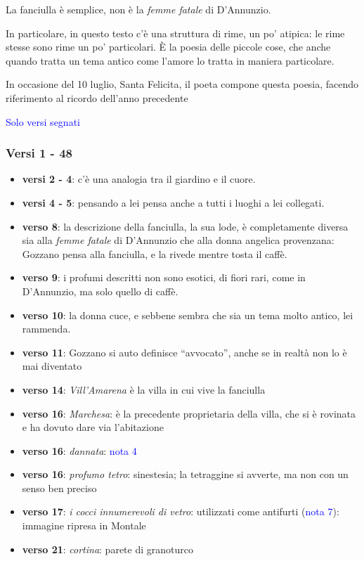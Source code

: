 \documentclass[a4paper, twoside, titlepage]{book}
\newcounter{mar}
\newcommand{\elenco}[1]{%
\begin{itemize}
#1
\end{itemize}}
\renewcommand{\emph}[1]{\textcolor{blue}{#1}}
\begin{document}
La fanciulla è semplice, non è la \textit{femme fatale} di D’Annunzio.

In particolare, in questo testo c’è una struttura di rime, un po’ atipica: le rime stesse sono rime un po’ particolari. È la poesia delle piccole cose, che anche quando tratta un tema antico come l’amore lo tratta in maniera particolare.

In occasione del 10 luglio, Santa Felicita, il poeta compone questa poesia, facendo riferimento al ricordo dell’anno precedente

\emph{Solo versi segnati}

\subsubsection{Versi 1 - 48}

\elenco{
	\item \textbf{versi 2 - 4}: c’è una analogia tra il giardino e il cuore. 
	\item \textbf{versi 4 - 5}: pensando a lei pensa anche a tutti i luoghi a lei collegati.
	\item \textbf{verso 8}: la descrizione della fanciulla, la sua lode, è completamente diversa sia alla \textit{femme fatale} di D’Annunzio che alla donna angelica provenzana: Gozzano pensa alla fanciulla, e la rivede mentre tosta il caffè.
	\item \textbf{verso 9}: i profumi descritti non sono esotici, di fiori rari, come in D’Annunzio, ma solo quello di caffè.
	\item \textbf{verso 10}: la donna cuce, e sebbene sembra che sia un tema molto antico, lei rammenda.
	\item \textbf{verso 11}: Gozzano si auto definisce “avvocato”, anche se in realtà non lo è mai diventato
	\item \textbf{verso 14}: \textit{Vill’Amarena} è la villa in cui vive la fanciulla
	\item \textbf{verso 16}: \textit{Marchesa}: è la precedente proprietaria della villa, che si è rovinata e ha dovuto dare via l’abitazione
	\item \textbf{verso 16}: \textit{dannata}: \emph{nota 4}
	\item \textbf{verso 16}: \textit{profumo tetro}: sinestesia; la tetraggine si avverte, ma non con un senso ben preciso
	\item \textbf{verso 17}: \textit{i cocci innumerevoli di vetro}: utilizzati come antifurti (\emph{nota 7}): immagine ripresa in Montale
	\item \textbf{verso 21}: \textit{cortina}: parete di granoturco
}
\end{document}
